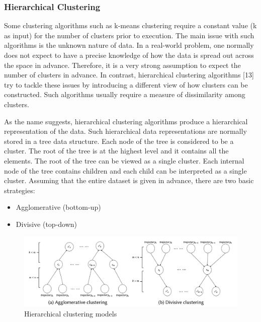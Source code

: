 \documentclass[a4paper, 12pt]{article}
\begin{document}
\subsubsection{Hierarchical Clustering}
Some clustering algorithms such as k-means clustering \citep{macqueen1967some} require a constant value (k as input) for the number of clusters prior to execution. The main issue with such algorithms is the unknown nature of data. In a real-world problem, one normally does not expect to have a precise knowledge of how the data is spread out across the space in advance. Therefore, it is a very strong assumption to expect the number of clusters in advance. In contrast, hierarchical clustering algorithms [13] try to tackle these issues by introducing a different view of how clusters can be constructed. Such algorithms usually require a measure of dissimilarity among clusters.

As the name suggests, hierarchical clustering algorithms produce a hierarchical representation of the data. Such hierarchical data representations are normally stored in a tree data structure. Each node of the tree is considered to be a cluster. The root of the tree is at the highest level and it contains all the elements. The root of the tree can be viewed as a single cluster. Each internal node of the tree contains children and each child can be interpreted as a single cluster. Assuming that the entire dataset is given in advance, there are two basic strategies:

\begin{itemize}
    \item Agglomerative (bottom-up)
    \item Divisive (top-down)
\end{itemize}

\begin{figure}[ht]
    \centering
    \includegraphics[width=1\textwidth]{AP Clustering.png}
    \caption{Hierarchical clustering models \citep{bian2019trajectory}}
    \label{fig14}
\end{figure}
\end{document}
